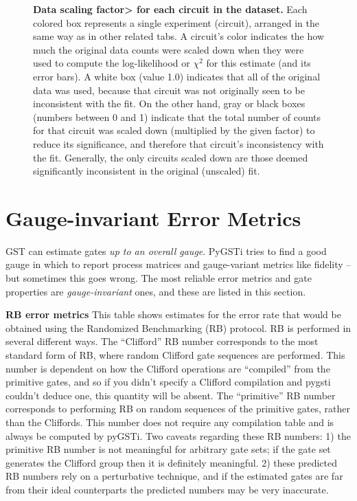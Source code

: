 \documentclass{article}[11pt]
\newcommand{\putfield}[2]{#2}
\begin{document}
{{\begin{figure}
  \begin{center}
    \putfield{dataScalingColorBoxPlot}{}
    \caption{\textbf{Data scaling factor> for each circuit in the dataset.}  Each colored box represents a single experiment (circuit), arranged in the same way as in other related tabs.  A circuit's color indicates the how much the original data counts were scaled down when they were used to compute the log-likelihood or $\chi^2$ for this estimate (and its error bars).  A white box (value 1.0) indicates that all of the original data was used, because that circuit was not originally seen to be inconsistent with the fit. On the other hand, gray or black boxes (numbers between 0 and 1) indicate that the total number of counts for that circuit was scaled down (multiplied by the given factor) to reduce its significance, and therefore that circuit's inconsistency with the fit.  Generally, the only circuits scaled down are those deemed significantly inconsistent in the original (unscaled) fit.
    }
  \end{center}
\end{figure}

}{}


\section{Gauge-invariant Error Metrics}
GST can estimate gates \emph{up to an overall gauge}.  PyGSTi tries to find a good gauge in which to report process matrices and gauge-variant metrics like fidelity -- but sometimes this goes wrong.  The most reliable error metrics and gate properties are \emph{gauge-invariant} ones, and these are listed in this section.

\begin{table}[h]
  \begin{center}
    \begin{adjustbox}{max width=\textwidth}
      \putfield{bestGatesetVsTargetTable}{}
    \end{adjustbox}
    \caption{\textbf{RB error metrics} This table shows estimates for the error rate that would be obtained using the Randomized Benchmarking (RB) protocol.  RB is performed in several different ways.  The ``Clifford'' RB number corresponds to the most standard form of RB, where random Clifford gate sequences are performed.  This number is dependent on how the Clifford operations are ``compiled'' from the primitive gates, and so if you didn't specify a Clifford compilation and pygsti couldn't deduce one, this quantity will be absent.  The ``primitive'' RB number corresponds to performing RB on random sequences of the primitive gates, rather than the Cliffords.  This number does not require any compilation table and is always be computed by pyGSTi.  Two caveats regarding these RB numbers: 1) the primitive RB number is not meaningful for arbitrary gate sets; if the gate set generates the Clifford group then it is definitely meaningful. 2) these predicted RB numbers rely on a perturbative technique, and if the estimated gates are far from their ideal counterparts the predicted numbers may be very inaccurate.}
  \end{center}
\end{table}

}
\end{document}
